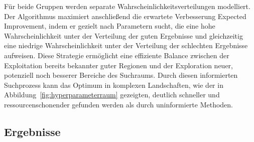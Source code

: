 Für beide Gruppen werden separate Wahrscheinlichkeitsverteilungen modelliert. Der Algorithmus maximiert 
anschließend die erwartete Verbesserung Expected Improvement, indem er gezielt nach Parametern sucht, 
die eine hohe Wahrscheinlichkeit unter der Verteilung der guten Ergebnisse und gleichzeitig eine 
niedrige Wahrscheinlichkeit unter der Verteilung der schlechten Ergebnisse aufweisen. Diese Strategie 
ermöglicht eine effiziente Balance zwischen der Exploitation bereits bekannter guter 
Regionen und der Exploration neuer, potenziell noch besserer Bereiche des Suchraums. 
Durch diesen informierten Suchprozess kann das Optimum in komplexen Landschaften, wie der in 
Abbildung~\ref{fig:hyperparameterraum} gezeigten, deutlich schneller und ressourcenschonender 
gefunden werden als durch uninformierte Methoden.

\subsection{Ergebnisse}



% 


% 